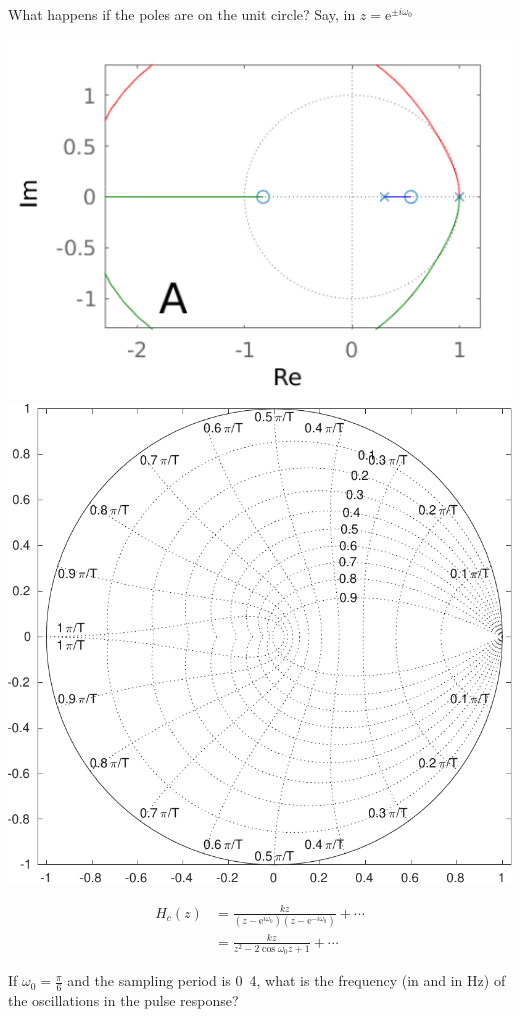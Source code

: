 \documentclass[presentation,aspectratio=169]{beamer}
\begin{document}
\begin{frame}[label=sec-3-9]{What happens if the poles are \alert{on the} unit circle?}
Say, in \(z = \mathrm{e}^{\pm i \omega_0}\)
\begin{center}
\includegraphics[width=0.3\linewidth]{../../figures/rlocusA.png}
\includegraphics[height=0.34\textheight]{../../figures/zgrid-crop}\\
\end{center}

\begin{align*}
H_c(z) &= \frac{k z}{(z-\mathrm{e}^{i \omega_0})(z-\mathrm{e}^{-i \omega_0})} + \cdots\\
       &= \frac{k z}{z^2 -2\cos\omega_0 z + 1} + \cdots
\end{align*}

If \(\omega_0 = \frac{\pi}{6}\) and the sampling period is \unit{0.4}{\second}, what is the \alert{frequency} (in \unit{}{\radian\per\second} and in Hz) of the oscillations in the pulse response?
\end{frame}
\end{document}
